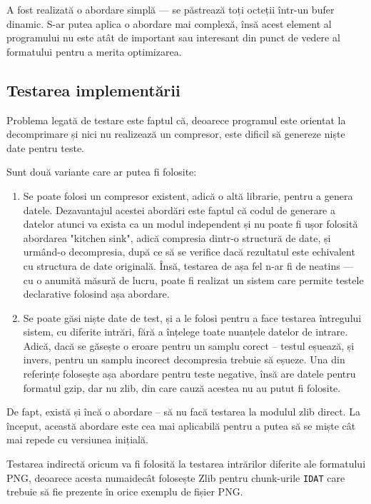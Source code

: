 \documentclass[a4paper,12pt]{report}
\begin{document}
A fost realizată o abordare simplă --- se păstrează toți octeții într-un bufer dinamic.
S-ar putea aplica o abordare mai complexă, însă acest element al programului
nu este atât de important sau interesant din punct de vedere al formatului pentru a merita optimizarea.

\subsection{Testarea implementării}

Problema legată de testare este faptul că, deoarece programul este orientat
la decomprimare și nici nu realizează un compresor,
este dificil să genereze niște date pentru teste.

Sunt două variante care ar putea fi folosite:
\begin{enumerate}
    \item
        Se poate folosi un compresor existent, adică o altă librarie, pentru a genera datele.
        Dezavantajul acestei abordări este faptul că codul de generare a datelor atunci va exista
        ca un modul independent și nu poate fi ușor folosită abordarea "kitchen sink", adică
        compresia dintr-o structură de date, și urmând-o decompresia, după ce să se verifice
        dacă rezultatul este echivalent cu structura de date originală.
        Însă, testarea de așa fel n-ar fi de neatins --- cu o anumită măsură de lucru,
        poate fi realizat un sistem care permite testele declarative folosind așa abordare.
    \item
        Se poate găsi niște date de test, și a le folosi pentru a face testarea
        întregului sistem, cu diferite intrări, fără a înțelege toate nuanțele datelor de intrare.
        Adică, dacă se găsește o eroare pentru un samplu corect -- testul eșuează,
        și invers, pentru un samplu incorect decompresia trebuie să eșueze.
        Una din referințe \cite{gzip_impl} folosește așa abordare pentru teste negative,
        însă are datele pentru formatul gzip, dar nu zlib, din care cauză acestea nu au putut fi folosite.
\end{enumerate}

De fapt, există și încă o abordare -- să nu facă testarea la modulul zlib direct.
La început, această abordare este cea mai aplicabilă pentru a putea să se miște cât mai repede cu versiunea inițială.

Testarea indirectă oricum va fi folosită la testarea intrărilor diferite ale formatului \ac{PNG},
deoarece acesta numaidecât folosește Zlib pentru chunk-urile \texttt{IDAT} care trebuie să fie prezente
în orice exemplu de fișier \ac{PNG}.
\end{document}
